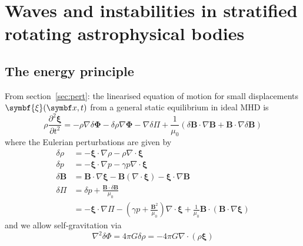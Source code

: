 \documentclass{jknotes}
\newcommand{\B}{\symbf{B}}
\newcommand{\flux}{\symbf{\Phi}}
\newcommand{\disp}{\symbf{\xi}}
\begin{document}
\section{Waves and instabilities in stratified rotating astrophysical bodies}
\subsection{The energy principle}
From section~\ref{sec:pert}: the linearised equation of motion for small
displacements $\disp(\x,t)$ from a general static equilibrium in ideal MHD is
\begin{equation}
	\rho \frac{\partial^2 \disp}{\partial t^2} = -\rho \nabla \delta \flux -
	\delta \rho \nabla \flux - \nabla \delta \Pi + \frac{1}{\mu_0}(\delta \B
	\cdot \nabla \B + \B \cdot \nabla \delta \B)
\end{equation}
where the Eulerian perturbations are given by
\begin{align}
	\delta \rho &= -\disp \cdot \nabla \rho - \rho \nabla \cdot \disp \\
	\delta p &= -\disp \cdot \nabla p - \gamma p \nabla \cdot \disp \\
	\delta \B &= \B \cdot \nabla \disp - \B (\nabla \cdot \disp) - \disp \cdot
			  \nabla \B\\
	\delta \Pi &= \delta p + \frac{\B \cdot \delta \B}{\mu_0} \\
			   &= -\disp \cdot \nabla \Pi - \left( \gamma p +
			   \frac{\B^2}{\mu_0}\right) \nabla \cdot \disp + \frac{1}{\mu_0}
			   \B \cdot (\B \cdot \nabla \disp)
\end{align}
and we allow self-gravitation via 
\begin{equation}
	\nabla^2 \delta \Phi = 4\pi G \delta \rho = -4\pi G \nabla \cdot (\rho
	\disp)
\end{equation}
\end{document}
